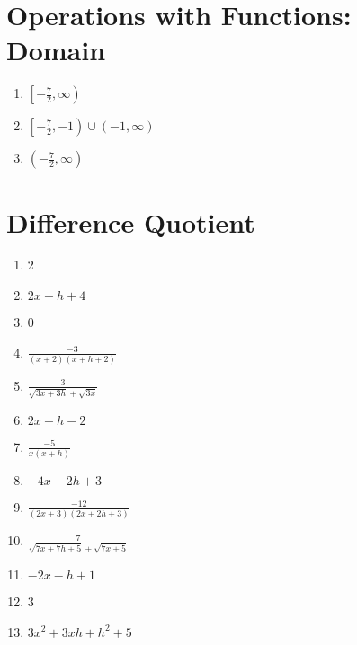 \section*{Operations with Functions: Domain}
\begin{enumerate}
	\item $\left[-\frac{7}{2}, \infty\right)$
    \item $\left[-\frac{7}{2}, -1\right) \cup (-1, \infty)$
    \item $\left(-\frac{7}{2}, \infty\right)$
\end{enumerate}

\section*{Difference Quotient}
\begin{multicols}{2}
\begin{enumerate}
	\item 2
	\item $2x + h + 4$
	\item 0
    \item $\frac{-3}{(x+2)(x+h+2)}$
    \item $\frac{3}{\sqrt{3x+3h}+\sqrt{3x}}$
    \item $2x+h-2$
    \item $\frac{-5}{x(x+h)}$
    \item $-4x-2h+3$
    \item $\frac{-12}{(2x+3)(2x+2h+3)}$
    \item $\frac{7}{\sqrt{7x+7h+5}+\sqrt{7x+5}}$
    \item $-2x - h + 1$
    \item 3
    \item $3x^2 + 3xh + h^2 + 5$
\end{enumerate}
\end{multicols}